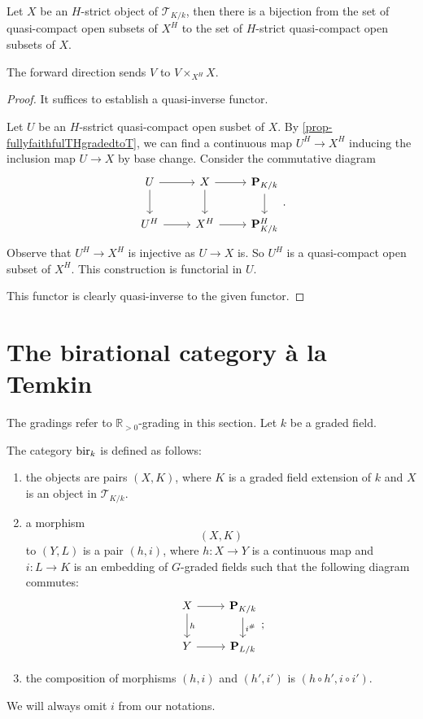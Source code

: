 \begin{proposition}
    Let $X$ be an $H$-strict object of $\mathcal{T}_{K/k}$, then there is a bijection from the set of quasi-compact open subsets of $X^{H}$ to the set of $H$-strict quasi-compact open subsets of $X$.

    The forward direction sends $V$ to $V\times_{X^{H}}X$.
\end{proposition}
\begin{proof}
    It suffices to establish a quasi-inverse functor.

    Let $U$ be an $H$-sstrict quasi-compact open susbet of $X$. By \cref{prop-fullyfaithfulTHgradedtoT}, we can find a continuous map $U^H\rightarrow X^H$ inducing the inclusion map $U\rightarrow X$ by base change. Consider the commutative diagram
    \[
        \begin{tikzcd}
            U \arrow[r] \arrow[d] & X \arrow[r] \arrow[d] & \mathbf{P}_{K/k} \arrow[d] \\
            U^H \arrow[r]         & X^H \arrow[r]         & \mathbf{P}_{K/k}^H        
            \end{tikzcd}.  
    \]
    Observe that $U^H\rightarrow X^H$ is injective as $U\rightarrow X$ is. So $U^H$ is a quasi-compact open subset of $X^H$. This construction is functorial in $U$.

    This functor is clearly quasi-inverse to the given functor.
\end{proof}

\section{The birational category à la Temkin}
The gradings refer to $\mathbb{R}_{>0}$-grading in this section. Let $k$ be a graded field.

\begin{definition}
    The category $\mathrm{bir}_k$ is defined as follows: 
    \begin{enumerate}
        \item the objects are pairs $(X,K)$, where $K$ is a graded field extension of $k$ and $X$ is an object in $\mathcal{T}_{K/k}$.
        \item a morphism $$(X,K)$$ to $(Y,L)$ is a pair $(h,i)$, where $h:X\rightarrow Y$ is a continuous map and $i:L\rightarrow K$ is an embedding of $G$-graded fields such that the following diagram commutes:
        \[
            \begin{tikzcd}
                X \arrow[d, "h"] \arrow[r] & \mathbf{P}_{K/k} \arrow[d, "i^{\#}"] \\
                Y \arrow[r]                & \mathbf{P}_{L/k}                    
            \end{tikzcd};
        \]
        \item the composition of morphisms $(h,i)$ and $(h',i')$ is $(h\circ h',i\circ i')$.
    \end{enumerate}
\end{definition}
We will always omit $i$ from our notations.

